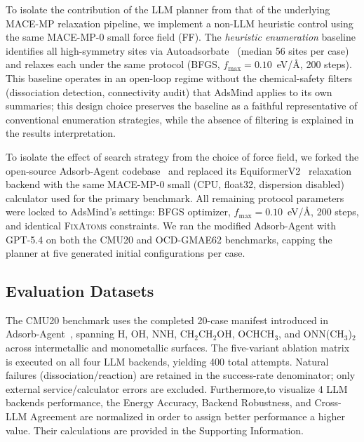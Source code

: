 \label{sec:nonllm_baselines}

To isolate the contribution of the LLM planner from that of the underlying MACE-MP relaxation pipeline, we implement a non-LLM heuristic control using the same MACE-MP-0 small force field (FF). The \textit{heuristic enumeration} baseline identifies all high-symmetry sites via Autoadsorbate~\cite{fako2025simple} (median 56 sites per case) and relaxes each under the same protocol (BFGS, $f_\mathrm{max}=0.10$~eV/\AA, 200 steps). This baseline operates in an open-loop regime without the chemical-safety filters (dissociation detection, connectivity audit) that AdsMind applies to its own summaries; this design choice preserves the baseline as a faithful representative of conventional enumeration strategies, while the absence of filtering is explained in the results interpretation.

\label{sec:adsorbagent_comparison}

To isolate the effect of search strategy from the choice of force field, we forked the open-source Adsorb-Agent codebase~\cite{adsorbagent} and replaced its EquiformerV2~\cite{liao2024equiformerv2} relaxation backend with the same MACE-MP-0 small (CPU, float32, dispersion disabled) calculator used for the primary benchmark. All remaining protocol parameters were locked to AdsMind's settings: BFGS optimizer, $f_\mathrm{max} = 0.10$~eV/\AA, 200 steps, and identical \textsc{FixAtoms} constraints. We ran the modified Adsorb-Agent with GPT-5.4 on both the CMU20 and OCD-GMAE62 benchmarks, capping the planner at five generated initial configurations per case.


\subsection{Evaluation Datasets}
The CMU20 benchmark uses the completed 20-case manifest introduced in Adsorb-Agent~\cite{adsorbagent}, spanning H, OH, NNH, CH$_2$CH$_2$OH, OCHCH$_3$, and ONN(CH$_3$)$_2$ across intermetallic and monometallic surfaces.
The five-variant ablation matrix is executed on all four LLM backends, yielding 400 total attempts.
Natural failures (dissociation/reaction) are retained in the success-rate denominator; only external service/calculator errors are excluded.
Furthermore,to visualize 4 LLM backends performance, the Energy Accuracy, Backend Robustness, and Cross-LLM Agreement are normalized in order to assign better performance a higher value. Their calculations are provided in the Supporting Information.

